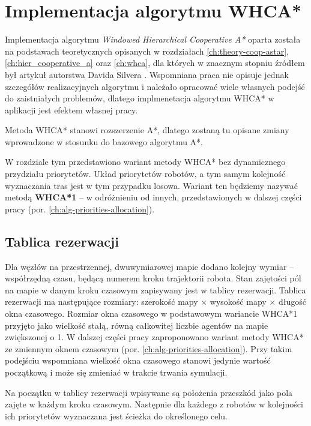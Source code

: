 \section{Implementacja algorytmu WHCA*}
\label{ch:alg-whca}

Implementacja algorytmu {\it  Windowed Hierarchical Cooperative A*} oparta została na podstawach teoretycznych opisanych w rozdziałach \ref{ch:theory-coop-astar}, \ref{ch:hier_cooperative_a} oraz \ref{ch:whca}, dla których w znacznym stopniu źródłem był artykuł autorstwa Davida Silvera \cite{cooppath}.
Wspomniana praca nie opisuje jednak szczegółów realizacyjnych algorytmu i należało opracować wiele własnych podejść do zaistniałych problemów, dlatego implmenetacja algorytmu WHCA* w aplikacji jest efektem własnej pracy.

Metoda WHCA* stanowi rozszerzenie A*, dlatego zostaną tu opisane zmiany wprowadzone w stosunku do bazowego algorytmu A*.

W rozdziale tym przedstawiono wariant metody WHCA* bez dynamicznego przydziału priorytetów.
Układ priorytetów robotów, a tym samym kolejność wyznaczania tras jest w tym przypadku losowa.
Wariant ten będziemy nazywać metodą {\bf WHCA*1} -- w odróżnieniu od innych, przedstawionych w dalszej części pracy (por. \ref{ch:alg-priorities-allocation}). 

\subsection{Tablica rezerwacji}
Dla węzłów na przestrzennej, dwuwymiarowej mapie dodano kolejny wymiar -- współrzędną czasu, będącą numerem kroku trajektorii robota.
Stan zajętości pól na mapie w danym kroku czasowym zapisywany jest w tablicy rezerwacji.
Tablica rezerwacji ma następujące rozmiary: szerokość mapy $\times$ wysokość mapy $\times$ długość okna czasowego.
Rozmiar okna czasowego w podstawowym wariancie WHCA*1 przyjęto jako wielkość stałą, równą całkowitej liczbie agentów na mapie zwiększonej o 1.
W dalszej części pracy zaproponowano wariant metody WHCA* ze zmiennym oknem czasowym (por. \ref{ch:alg-priorities-allocation}). Przy takim podejściu wspomniana wielkość okna czasowego stanowi jedynie wartość początkową i może się zmieniać w trakcie trwania symulacji.

Na początku w tablicy rezerwacji wpisywane są położenia przeszkód jako pola zajęte w każdym kroku czasowym.
Następnie dla każdego z robotów w kolejności ich priorytetów wyznaczana jest ścieżka do określonego celu.

